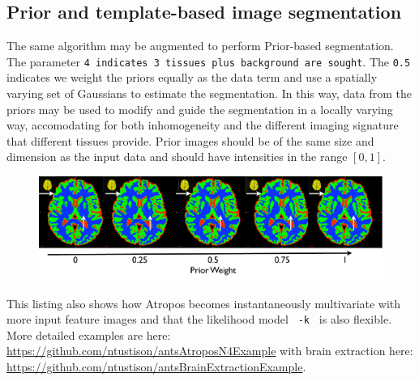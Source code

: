 \documentclass{InsightArticle}
\begin{document}
\subsection{Prior and template-based image segmentation}
The same algorithm may be augmented 
to perform Prior-based segmentation.  
The parameter \texttt{4 indicates 3 tissues plus background are sought}.  The \texttt{0.5} indicates 
we weight the priors equally as the data term and use a spatially varying set of Gaussians 
to estimate the segmentation.  In this way, data from the priors may be used to modify 
and guide the segmentation in a locally varying way, accomodating for both inhomogeneity 
and the different imaging signature that different tissues provide.   Prior images should be 
of the same size and dimension as the input data and should have intensities in the range $[0,1]$.

\begin{figure}
\includegraphics[width=1\textwidth]{Figures/segmentation2.pdf}
\label{fig:seg2}
\end{figure}
This listing also shows how Atropos becomes instantaneously
multivariate with more input feature images and that the likelihood
model \texttt{ -k } is also flexible.
More detailed examples are here:
\href{https://github.com/ntustison/antsAtroposN4Example}{https://github.com/ntustison/antsAtroposN4Example}
with brain extraction here: \href{https://github.com/ntustison/antsBrainExtractionExample}{https://github.com/ntustison/antsBrainExtractionExample}.
\end{document}
